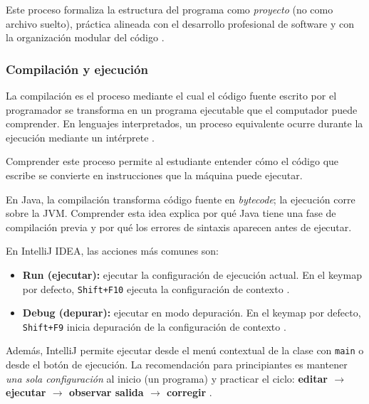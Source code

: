 \documentclass[12pt,twoside]{book}
\begin{document}
						\noindent
						Este proceso formaliza la estructura del programa como \emph{proyecto} (no como archivo suelto), práctica alineada con el desarrollo profesional de software y con la organización modular del código \cite{Pressman2019Software,Sommerville2015Software}.
						
					\subsubsection{Compilación y ejecución}
						\noindent
						La compilación es el proceso mediante el cual el código fuente escrito por el programador se transforma en un programa ejecutable que el computador puede comprender. En lenguajes interpretados, un proceso equivalente ocurre durante la ejecución mediante un intérprete \cite{Aho2007Compilers,Sebesta2018Concepts}.
						
						Comprender este proceso permite al estudiante entender cómo el código que escribe se convierte en instrucciones que la máquina puede ejecutar.
						
						En Java, la compilación transforma código fuente en \textit{bytecode}; la ejecución corre sobre la JVM. Comprender esta idea explica por qué Java tiene una fase de compilación previa y por qué los errores de sintaxis aparecen antes de ejecutar.
						
						En IntelliJ IDEA, las acciones más comunes son:
						
						\begin{itemize}
							\item \textbf{Run (ejecutar):} ejecutar la configuración de ejecución actual. En el keymap por defecto, \texttt{Shift+F10} ejecuta la configuración de contexto \cite{JetBrains2024Predefined}.
							\item \textbf{Debug (depurar):} ejecutar en modo depuración. En el keymap por defecto, \texttt{Shift+F9} inicia depuración de la configuración de contexto \cite{JetBrains2024Predefined,Android2023Keyboard}.
						\end{itemize}
						
						\noindent
						Además, IntelliJ permite ejecutar desde el menú contextual de la clase con \texttt{main} o desde el botón de ejecución. La recomendación para principiantes es mantener \emph{una sola configuración} al inicio (un programa) y practicar el ciclo: \textbf{editar $\rightarrow$ ejecutar $\rightarrow$ observar salida $\rightarrow$ corregir} \cite{Gaddis2022Starting,McConnell2004Code}.
						
\end{document}
